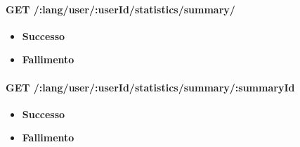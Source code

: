 \paragraph{GET /:lang/user/:userId/statistics/summary/}
\begin{itemize}
\item \textbf{Successo}
\item \textbf{Fallimento}
\end{itemize}


\paragraph{GET /:lang/user/:userId/statistics/summary/:summaryId}
\begin{itemize}
\item \textbf{Successo}
\item \textbf{Fallimento}
\end{itemize}



